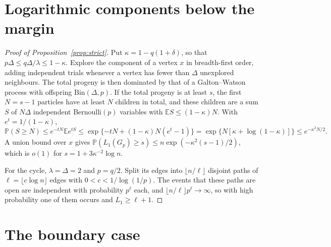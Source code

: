 \documentclass[11pt]{amsart}
\theoremstyle{remark}
\newcommand{\PP}{\mathbb{P}}
\newcommand{\EE}{\mathbb{E}}
\begin{document}
\section{Logarithmic components below the margin}\label{sec:strict}

\begin{proof}[Proof of Proposition~\ref{prop:strict}]
Put $\kappa=1-q(1+\delta)$, so that $p\Delta\le q\Delta/\lambda\le1-\kappa$. Explore the component of a vertex $x$ in
breadth-first order, adding independent trials whenever a vertex has fewer than $\Delta$ unexplored neighbours. The
total progeny is then dominated by that of a Galton--Watson process with offspring $\mathrm{Bin}(\Delta,p)$. If the
total progeny is at least $s$, the first $N=s-1$ particles have at least $N$ children in total, and these children are
a sum $S$ of $N\Delta$ independent Bernoulli$(p)$ variables with $\EE S\le(1-\kappa)N$. With $e^t=1/(1-\kappa)$,
\[
\PP(S\ge N)\le e^{-tN}\EE e^{tS}\le\exp\{-tN+(1-\kappa)N(e^t-1)\}=\exp\{N[\kappa+\log(1-\kappa)]\}\le
e^{-\kappa^2N/2}.
\]
A union bound over $x$ gives $\PP(L_1(G_p)\ge s)\le n\exp(-\kappa^2(s-1)/2)$, which is $o(1)$ for
$s=1+3\kappa^{-2}\log n$.

For the cycle, $\lambda=\Delta=2$ and $p=q/2$. Split its edges into $\lfloor n/\ell\rfloor$ disjoint paths of
$\ell=\lfloor c\log n\rfloor$ edges with $0<c<1/\log(1/p)$. The events that these paths are open are independent with
probability $p^\ell$ each, and $\lfloor n/\ell\rfloor p^\ell\to\infty$, so with high probability one of them occurs and
$L_1\ge\ell+1$.
\end{proof}

\section{The boundary case}\label{sec:boundary}
\end{document}
